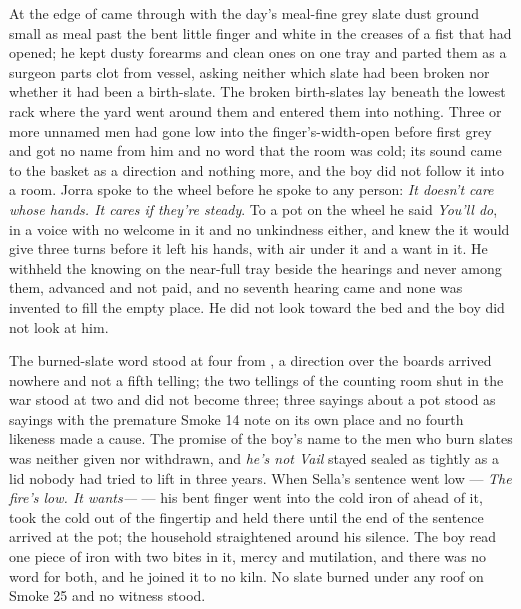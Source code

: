 At the edge of   came through with the day's meal-fine grey slate dust ground small as meal past the bent little finger and white in the creases of a fist that had opened; he kept dusty forearms and clean ones on one tray and parted them as a surgeon parts clot from vessel, asking neither which slate had been broken nor whether it had been a birth-slate. The broken birth-slates lay beneath the lowest rack where the yard went around them and entered them into nothing. Three or more unnamed men had gone low into the finger's-width-open  before first grey and got no name from him and no word that the room was cold; its sound came to the basket as a direction and nothing more, and the boy did not follow it into a room. Jorra spoke to the wheel before he spoke to any person: \emph{It doesn't care whose hands. It cares if they're steady}. To a pot on the wheel he said \emph{You'll do}, in a voice with no welcome in it and no unkindness either, and knew the  it would give three turns before it left his hands, with air under it and a want in it. He withheld the knowing on the near-full tray beside the hearings and never among them, advanced and not paid, and no seventh hearing came and none was invented to fill the empty place. He did not look toward the bed and the boy did not look at him.

The burned-slate word stood at four from , a direction over the boards arrived nowhere and not a fifth telling; the two tellings of the counting room shut in the war stood at two and did not become three; three sayings about a pot stood as sayings with the premature Smoke 14 note on its own place and no fourth likeness made a cause. The promise of the boy's name to the men who burn slates was neither given nor withdrawn, and \emph{he's not Vail} stayed sealed as tightly as a lid nobody had tried to lift in three years. When Sella's sentence went low --- \emph{The fire's low. It wants---} --- his bent finger went into the cold iron of  ahead of it, took the cold out of the fingertip and held there until the end of the sentence arrived at the pot; the household straightened around his silence. The boy read one piece of iron with two bites in it, mercy and mutilation, and there was no  word for both, and he joined it to no kiln. No slate burned under any roof on Smoke 25 and no witness stood.

\scenebreak


